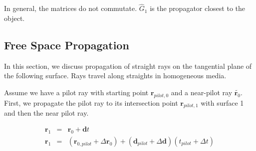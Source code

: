 \documentclass[12pt,a4paper,twoside,openright,BCOR10mm,headsepline,titlepage,abstracton,chapterprefix,final]{scrreprt}
\newcommand\Vector[1]{{\mathbf{#1}}}
\begin{document}
In general, the matrices do not commutate. $\hat{G}_1$ is the propagator closest to the object.


\subsection{Free Space Propagation}
In this section, we discuss propagation of straight rays on the tangential plane of the following surface.
Rays travel along straights in homogeneous media.

Assume we have a pilot ray with starting point $\Vector{r}_{pilot,0}$ and a near-pilot ray $\tilde{\Vector{r}_0}$.
First, we propagate the pilot ray to its intersection point $\Vector{r}_{pilot,1}$ with surface 1 and then the near pilot ray.

\begin{eqnarray}
 \Vector{r}_1 &=& \Vector{r}_0 + \Vector{d} t \\
 \Vector{r}_1 &=& (\Vector{r}_{0,pilot} + \Delta\Vector{r}_0) + (\Vector{d}_{pilot} + \Delta\Vector{d}) (t_{pilot} + \Delta t) \\ 
\end{eqnarray} 
\end{document}
